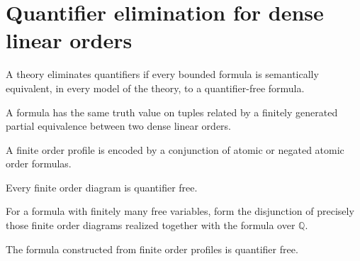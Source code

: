 \section{Quantifier elimination for dense linear orders}

\begin{definition}
\label{def:dlo-qe}
\leanok
A theory eliminates quantifiers if every bounded formula is semantically equivalent, in every model of the theory, to a quantifier-free formula.
\end{definition}

\begin{lemma}
\label{lem:dlo-fgequiv}
\leanok
A formula has the same truth value on tuples related by a finitely generated partial equivalence between two dense linear orders.
\end{lemma}

\begin{definition}
\label{def:dlo-order-diagram}
\leanok
A finite order profile is encoded by a conjunction of atomic or negated atomic order formulas.
\end{definition}

\begin{lemma}
\label{lem:dlo-order-diagram-qf}
\leanok
{}
Every finite order diagram is quantifier free.
\end{lemma}

\begin{definition}
\label{def:dlo-qf-finite}
\leanok
{}
For a formula with finitely many free variables, form the disjunction of precisely those finite order diagrams realized together with the formula over $\mathbb Q$.
\end{definition}

\begin{lemma}
\label{lem:dlo-qf-finite-isqf}
\leanok
{}
The formula constructed from finite order profiles is quantifier free.
\end{lemma}

